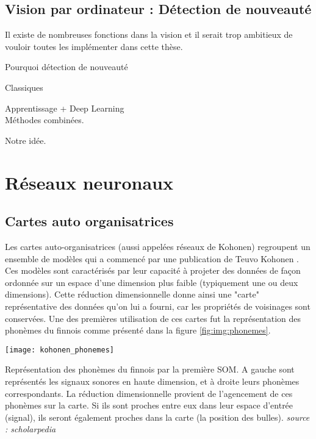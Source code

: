 \subsection{Vision par ordinateur : Détection de nouveauté}

	Il existe de nombreuses fonctions dans la vision et il serait trop ambitieux de vouloir toutes les implémenter dans cette thèse. 

	Pourquoi détection de nouveauté

	Classiques 

	Apprentissage + Deep Learning\\
	Méthodes combinées.


	Notre idée.

\newpage
\section{Réseaux neuronaux}
\subsection{Cartes auto organisatrices}\label{sec:sota:som}

	Les cartes auto-organisatrices (aussi appelées réseaux de Kohonen) regroupent un ensemble de modèles qui a commencé par une publication de Teuvo Kohonen \cite{kohonen-som82}. Ces modèles sont caractérisés par leur capacité à projeter des données de façon ordonnée sur un espace d'une dimension plus faible (typiquement une ou deux dimensions). Cette réduction dimensionnelle donne ainsi une "carte" représentative des données qu'on lui a fourni, car les propriétés de voisinages sont conservées. Une des premières utilisation de ces cartes fut la représentation des phonèmes du finnois comme présenté dans la figure \ref{fig:img:phonemes}.

	\begin{figureth}
		\texttt{[image: kohonen\_phonemes]}
		\caption[Phonème SOM]{Représentation des phonèmes du finnois par la première SOM. A gauche sont représentés les signaux sonores en haute dimension, et à droite leurs phonèmes correspondants. La réduction dimensionnelle provient de l'agencement de ces phonèmes sur la carte. Si ils sont proches entre eux dans leur espace d'entrée (signal), ils seront également proches dans la carte (la position des bulles). \textit{source : scholarpedia}}\label{fig:img:phonemes}

	\end{figureth}

